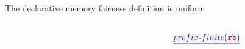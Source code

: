 \newcommand{\fakeTheoremOneline}[1]{
  #1
}
\newcommand{\fakeTheoremOnelineN}[2]{
  {\color{\colorTitleApprox}\large \textit{Theorem #1.}} #2
}

\newcommand{\thmLine}[3]{${\color{\colorTitleApprox}\large \textit{Theorem #1.}}$ & $#2$ & $\equiv$ & $#3 \cap \fairDecl$}

\begin{frame}{The declarative memory fairness definition is uniform}

  \begin{columns}
    
    \begin{column}{0.45\linewidth}
      \begin{center}
        \propSubtrace
      \end{center}    
    \end{column}

    \begin{column}{0.05\linewidth}
      \raisebox{-0.5cm}{\LARGE $\approx$}
    \end{column}
    
    \begin{column}{0.40\linewidth}
      \begin{center}
        ${\color{\colorTitleApprox}\underline{prefix\text{-}finite(\lFR)}}$
      \end{center}
    \end{column}      

  \end{columns}
  
  \vspace{0.5cm}
  \pause



\end{frame}
